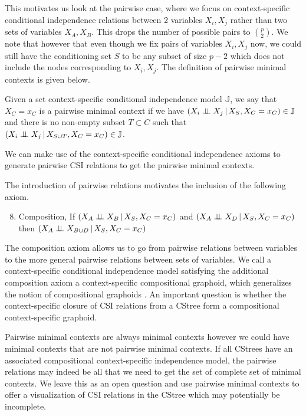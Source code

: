 \documentclass{tufte-book}
\begin{document}
This motivates us look at the pairwise case, where we focus on context-specific conditional independence relations between 2 variables \(X_i,X_j\) rather than two sets of variables \(X_A,X_B\). This drops the number of possible pairs to \(p \choose 2\). We note that however that even though we fix pairs of variables \(X_i,X_j\) now, we could still have the conditioning set \(S\) to be any subset of size \(p-2\) which does not include the nodes corresponding to \(X_i,X_j\). The definition of pairwise minimal contexts is given below.


\begin{definition}\label{def:pairmcs}
Given a set context-specific conditional independence model $\mathbb{J}$, we say that ${X_C=x_C}$ is a pairwise minimal context if we have $(X_i  \perp \!\!\! \perp X_j \,|\, X_S, X_C=x_C) \in \mathbb{J}$ and there is no non-empty subset $T \subset C$ such that $(X_i \perp \!\!\! \perp X_j \,|\, X_{S \cup T}, X_C=x_C) \in \mathbb{J}$.
\end{definition}

We can make use of the context-specific conditional independence axioms to generate pairwise CSI relations to get the pairwise minimal contexts.


The introduction of pairwise relations motivates the inclusion of the following axiom.
\begin{enumerate}
\setcounter{enumi}{7}
\item Composition, If \((X_A \perp \!\!\! \perp X_B \,|\, X_S, X_C=x_C)\) and \((X_A \perp \!\!\! \perp X_D \,|\,X_S,X_C=x_C)\) then \((X_A \perp \!\!\! \perp X_{B\cup D} \,|\,X_S,X_C=x_C)\)
\end{enumerate}


The composition axiom allows us to go from pairwise relations between variables to the more general pairwise relations between sets of variables. We call a context-specific conditional independence model satisfying the additional composition axiom a context-specific compositional graphoid, which generalizes the notion of compositional graphoids \cite{sadeghi-2014-markov-proper}. An important question is whether the context-specific closure of CSI relations from a CStree form a compositional context-specific graphoid.


Pairwise minimal contexts are always minimal contexts however we could have minimal contexts that are not pairwise minimal contexts. If all CStrees have an associated compositional context-specific independence model, the pairwise relations may indeed be all that we need to get the set of complete set of minimal contexts. We leave this as an open question and use pairwise minimal contexts to offer a visualization of CSI relations in the CStree which may potentially be incomplete.
\end{document}
